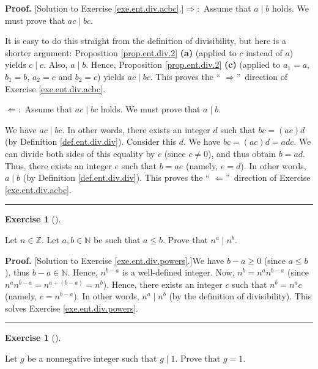 \documentclass[numbers=enddot,12pt,final,onecolumn,notitlepage]{scrartcl}%
\newcounter{exer}
\numberwithin{exer}{subsection}
\theoremstyle{definition}
\newtheorem{exmp}[exer]{Exercise}
\newenvironment{exercise}[1][]
{\begin{exmp}[#1]\begin{leftbar}}
{\end{leftbar}\end{exmp}}
\newenvironment{fineprint}{\begin{small}}{\end{small}}
\newenvironment{proof}[1][Proof]{\noindent\textbf{#1.} }{\ \rule{0.5em}{0.5em}}
\begin{document}
\begin{fineprint}
\begin{proof}
[Solution to Exercise \ref{exe.ent.div.acbc}.]$\Longrightarrow:$ Assume that
$a\mid b$ holds. We must prove that $ac\mid bc$.

It is easy to do this straight from the definition of divisibility, but here
is a shorter argument: Proposition \ref{prop.ent.div.2} \textbf{(a)} (applied
to $c$ instead of $a$) yields $c\mid c$. Also, $a\mid b$. Hence, Proposition
\ref{prop.ent.div.2} \textbf{(c)} (applied to $a_{1}=a$, $b_{1}=b$, $a_{2}=c$
and $b_{2}=c$) yields $ac\mid bc$. This proves the \textquotedblleft%
$\Longrightarrow$\textquotedblright\ direction of Exercise
\ref{exe.ent.div.acbc}.

$\Longleftarrow:$ Assume that $ac\mid bc$ holds. We must prove that $a\mid b$.

We have $ac\mid bc$. In other words, there exists an integer $d$ such that
$bc=\left(  ac\right)  d$ (by Definition \ref{def.ent.div.div}). Consider this
$d$. We have $bc=\left(  ac\right)  d=adc$. We can divide both sides of this
equality by $c$ (since $c\neq0$), and thus obtain $b=ad$. Thus, there exists
an integer $e$ such that $b=ae$ (namely, $e=d$). In other words, $a\mid b$ (by
Definition \ref{def.ent.div.div}). This proves the \textquotedblleft%
$\Longleftarrow$\textquotedblright\ direction of Exercise
\ref{exe.ent.div.acbc}.
\end{proof}
\end{fineprint}

\begin{exercise}
\label{exe.ent.div.powers}Let $n\in\mathbb{Z}$. Let $a,b\in\mathbb{N}$ be such
that $a\leq b$. Prove that $n^{a}\mid n^{b}$.
\end{exercise}

\begin{fineprint}
\begin{proof}
[Solution to Exercise \ref{exe.ent.div.powers}.]We have $b-a\geq0$ (since
$a\leq b$), thus $b-a\in\mathbb{N}$. Hence, $n^{b-a}$ is a well-defined
integer. Now, $n^{b}=n^{a}n^{b-a}$ (since $n^{a}n^{b-a}=n^{a+\left(
b-a\right)  }=n^{b}$). Hence, there exists an integer $c$ such that
$n^{b}=n^{a}c$ (namely, $c=n^{b-a}$). In other words, $n^{a}\mid n^{b}$ (by
the definition of divisibility). This solves Exercise \ref{exe.ent.div.powers}.
\end{proof}
\end{fineprint}

\begin{exercise}
\label{exe.ent.div.g|1}Let $g$ be a nonnegative integer such that $g\mid1$.
Prove that $g=1$.
\end{exercise}
\end{document}
